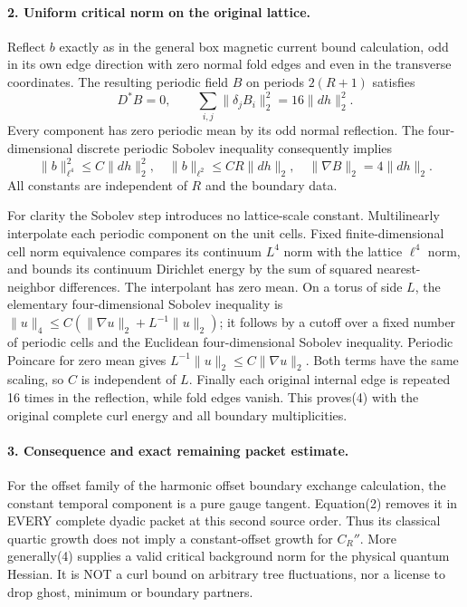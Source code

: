 \documentclass[11pt]{article}
\begin{document}
\paragraph{2. Uniform critical norm on the original lattice.}
Reflect $b$ exactly as in the general box magnetic current bound calculation, odd in its own edge direction
with zero normal fold edges and even in the transverse coordinates.
The resulting periodic field $B$ on periods $2(R+1)$ satisfies
\[
 D^*B=0,\qquad \sum_{i,j}\|\delta_jB_i\|_2^2
                       =16\|dh\|_2^2.                      \tag{3}
\]
Every component has zero periodic mean by its odd normal reflection.
The four-dimensional discrete periodic Sobolev inequality consequently
implies
\[
 \boxed{\|b\|_{\ell^4}^2\le C\|dh\|_2^2,
 \quad \|b\|_{\ell^2}\le CR\|dh\|_2,
 \quad \|\nabla B\|_2=4\|dh\|_2.}                          \tag{4}
\]
All constants are independent of $R$ and the boundary data.

For clarity the Sobolev step introduces no lattice-scale constant.
Multilinearly interpolate each periodic component on the unit cells.
Fixed finite-dimensional cell norm equivalence compares its continuum
$L^4$ norm with the lattice $\ell^4$ norm, and bounds its continuum
Dirichlet energy by the sum of squared nearest-neighbor differences.
The interpolant has zero mean. On a torus of side $L$, the elementary
four-dimensional Sobolev inequality is
$\|u\|_4\le C(\|\nabla u\|_2+L^{-1}\|u\|_2)$;
it follows by a cutoff over a fixed number of periodic cells and the
Euclidean four-dimensional Sobolev inequality. Periodic Poincare for
zero mean gives $L^{-1}\|u\|_2\le C\|\nabla u\|_2$.
Both terms have the same scaling, so $C$ is independent of $L$.
Finally each original internal edge is repeated 16 times in the
reflection, while fold edges vanish. This proves(4) with the original
complete curl energy and all boundary multiplicities.

\paragraph{3. Consequence and exact remaining packet estimate.}
For the offset family of the harmonic offset boundary exchange calculation, the constant temporal component is a pure
gauge tangent. Equation(2) removes it in EVERY complete dyadic packet
at this second source order. Thus its classical quartic growth does
not imply a constant-offset growth for $C_R''$.
More generally(4) supplies a valid critical background norm for the
physical quantum Hessian. It is NOT a curl bound on arbitrary tree
fluctuations, nor a license to drop ghost, minimum or boundary partners.
\end{document}
